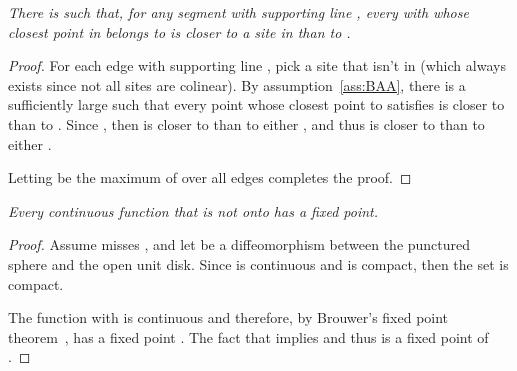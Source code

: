 \documentclass[11pt]{article}
\begin{document}
\emph{
There is  such that, for any segment  with supporting line , 
	 every  with  whose closest point in  belongs to  is 
	closer to a site in  than to . }
\begin{proof}
For each edge  with supporting line , 
	pick a site  that isn't in  (which always exists since not all sites are colinear). 
By assumption~\ref{ass:BAA}, there is a sufficiently large  such that every point  
	whose closest point  to  satisfies  is closer to  than to . 
Since , then  is closer to  than to either , and 
thus  is closer to  than to either . 

Letting  be the maximum of  over all edges   completes the proof. 
\end{proof}






\emph{
	Every continuous function  that is not onto has a fixed point. 
}
\begin{proof}
	Assume  misses , and let
 be a diffeomorphism
between the punctured sphere and the open unit disk. 
Since  is continuous and  is compact,
then the set  is compact.

The function  with  
is continuous and therefore, by Brouwer's fixed point theorem~\cite{Milnor}, has a fixed point . 
The fact that  implies  
and thus  is a fixed point of . 
\end{proof}
\end{document}
